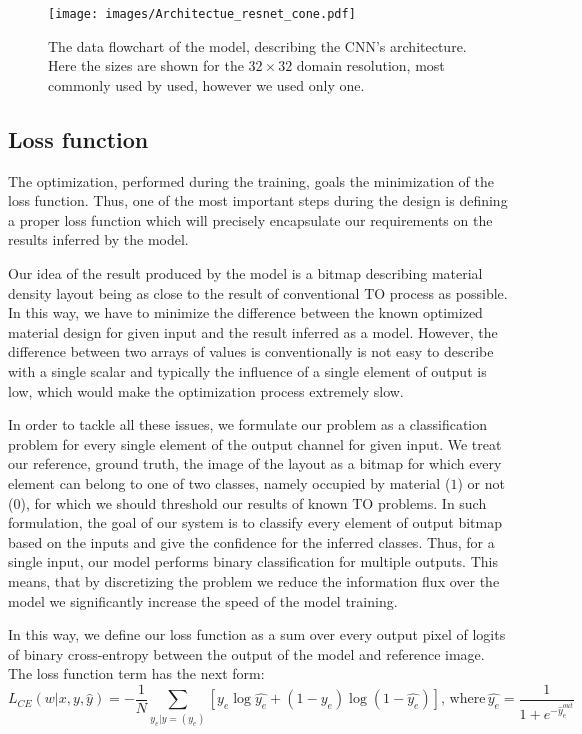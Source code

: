 \begin{figure}[h]
	\centering
	\texttt{[image: images/Architectue\_resnet\_cone.pdf]}
	\label{fig:arch_1}
	\caption{The data flowchart of the model, describing the CNN's architecture. Here the sizes are shown for the $32 \times 32$ domain resolution, most commonly used by used, however we used only one.}
\end{figure}


\subsection{Loss function}

The optimization, performed during the training, goals the minimization of the loss function.
Thus, one of the most important steps during the design is defining a proper loss function which will precisely encapsulate our requirements on the results inferred by the model.
\medskip

Our idea of the result produced by the model is a bitmap describing material density layout being as close to the result of conventional TO process as possible.
In this way, we have to minimize the difference between the known optimized material design for given input and the result inferred as a model.
However, the difference between two arrays of values is conventionally is not easy to describe with a single scalar and typically the influence of a single element of output is low, which would make the optimization process extremely slow.
\medskip

In order to tackle all these issues, we formulate our problem as a classification problem for every single element of the output channel for given input. 
We treat our reference, ground truth, the image of the layout as a bitmap for which every element can belong to one of two classes, namely occupied by material ($1$)  or not ($0$), for which we should threshold our results of known TO problems.
In such formulation, the goal of our system is to classify every element of output bitmap based on the inputs and give the confidence for the inferred classes.
Thus, for a single input, our model performs binary classification for multiple outputs.
This means, that by discretizing the problem we reduce the information flux over the model we significantly increase the speed of the model training.
\medskip

In this way, we define our loss function as a sum over every output pixel of logits of binary cross-entropy between the output of the model and reference image.
The loss function term has the next form:
\begin{equation}
 L_{CE}(w|x, y, \hat{y}) = -\frac{1}{N} \sum_{y_{e}|y=(y_{e})}^{} [ y_{e} \log \hat{y_{e}} + (1-y_{e}) \log (1-\hat{y_{e}})] , \, \mathrm{where} \, \hat{y_{e}} = \frac{1}{1+e^{-\hat{y}^{out}_{e}}}
\end{equation}
\medskip

